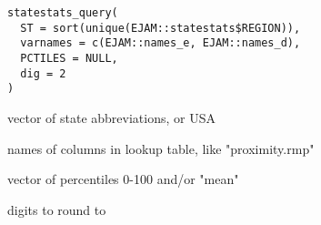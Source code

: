 \documentclass[a4paper]{book}
\begin{document}
%
\begin{Usage}
\begin{verbatim}
statestats_query(
  ST = sort(unique(EJAM::statestats$REGION)),
  varnames = c(EJAM::names_e, EJAM::names_d),
  PCTILES = NULL,
  dig = 2
)
\end{verbatim}
\end{Usage}
%
\begin{Arguments}
\begin{ldescription}
\item[\code{ST}] vector of state abbreviations, or USA

\item[\code{varnames}] names of columns in lookup table, like "proximity.rmp"

\item[\code{PCTILES}] vector of percentiles 0-100 and/or "mean"

\item[\code{dig}] digits to round to
\end{ldescription}
\end{Arguments}
%
\end{document}
